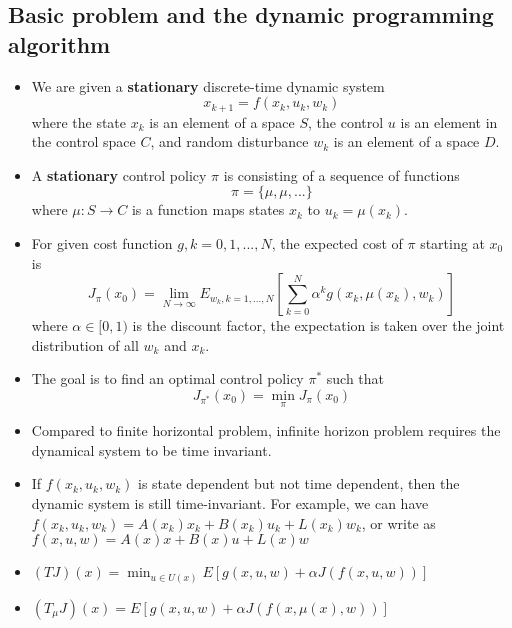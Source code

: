 \begin{refsection}
\subsection{Basic problem and the dynamic programming algorithm}
\begin{definition}\cite[3]{bertsekas2012dynamic2}\hfill
	\begin{itemize}
		\item We are given a \textbf{stationary} discrete-time dynamic system
		$$x_{k+1}  =  f(x_k,u_k,w_k)$$
		where the state $x_k$ is an element of a space $S$, the control $u$ is an element in the control space $C$, and random disturbance $w_k$ is an element of a space $D$.
		\item A \textbf{stationary} control policy $\pi$ is consisting of a sequence of functions
		$$\pi = \{\mu,\mu,...\}$$
		where $\mu:S\to C$ is a function  maps states $x_k$ to $u_k = \mu(x_k)$.
		\item For given cost function $g,k=0,1,...,N$, the expected cost of $\pi$ starting at $x_0$ is
		$$J_\pi(x_0) = \lim_{N\to\infty}E_{w_k,k=1,...,N}[\sum_{k=0}^N \alpha^k g(x_k,\mu(x_k),w_k)]$$
		where $\alpha\in [0,1)$ is the discount factor, the expectation is taken over the joint distribution of all $w_k$ and $x_k$.
		\item The goal is to find an optimal control policy $\pi^*$ such that 
		$$J_{\pi^*}(x_0) = \min_{\pi} J_\pi(x_0)$$
	\end{itemize}
\end{definition}

\begin{remark}\hfill
\begin{itemize}
\item Compared to finite horizontal problem, infinite horizon problem requires the dynamical system to be time invariant. 
\item If $f(x_k,u_k,w_k)$ is state dependent but not time dependent, then the dynamic system is still time-invariant. For example, we can have $f(x_k,u_k,w_k) = A(x_k)x_k + B(x_k)u_k + L(x_k)w_k$, or write as $f(x,u,w) = A(x)x + B(x)u + L(x)w$
\end{itemize}	
\end{remark}


\begin{definition}\hfill
	\begin{itemize}
		\item $(TJ)(x) = \min_{u\in U(x)} E[g(x,u,w) + \alpha J(f(x,u,w))]$
		\item $(T_\mu J)(x) =  E[g(x,u,w) + \alpha J(f(x,\mu(x),w))]$
	\end{itemize}
\end{definition}



\end{refsection}
